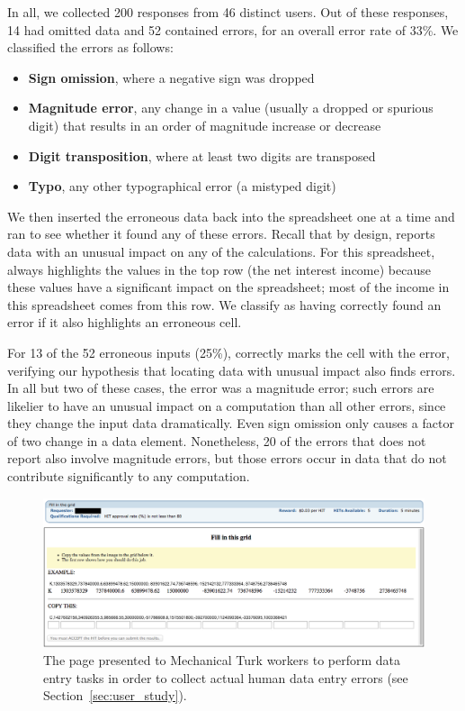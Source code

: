 In all, we collected 200 responses from 46 distinct users. Out of
these responses, 14 had omitted data and 52 contained errors, for an
overall error rate of 33\%. We classified the errors as follows:

\begin{itemize}
\item \textbf{Sign omission}, where a negative sign was dropped
\item \textbf{Magnitude error}, any change in a value (usually a dropped or spurious digit) that results in an order of magnitude increase or decrease
\item \textbf{Digit transposition}, where at least two digits are transposed
\item \textbf{Typo}, any other typographical error (a mistyped digit)
\end{itemize}

We then inserted the erroneous data back into the spreadsheet one at a
time and ran \checkcell{} to see whether it found any of these
errors. Recall that by design, \checkcell{} reports data with an
unusual impact on any of the calculations. For this
spreadsheet, \checkcell{} always highlights the values in the top row
(the net interest income) because these values have a significant
impact on the spreadsheet; most of the income in this spreadsheet
comes from this row. We classify \checkcell{} as having correctly
found an error if it also highlights an erroneous cell.

For 13 of the 52 erroneous inputs (25\%), \checkcell{} correctly marks
the cell with the error, verifying our hypothesis that locating data
with unusual impact also finds errors. In all but two of these cases,
the error was a magnitude error; such errors are likelier to have an
unusual impact on a computation than all other errors, since they
change the input data dramatically. Even sign omission only causes a
factor of two change in a data element. Nonetheless, 20 of the errors
that \checkcell{} does not report also involve magnitude errors, but
those errors occur in data that do not contribute significantly to any
computation.


\begin{figure}[!t]
\centering
\includegraphics[width=5.5in]{images/mturk_fuzz_task}
  \caption{The page presented to Mechanical Turk workers to perform data entry tasks in order to collect actual human data entry errors (see Section~\ref{sec:user_study}).\label{fig:mturk_task}}
\end{figure}


